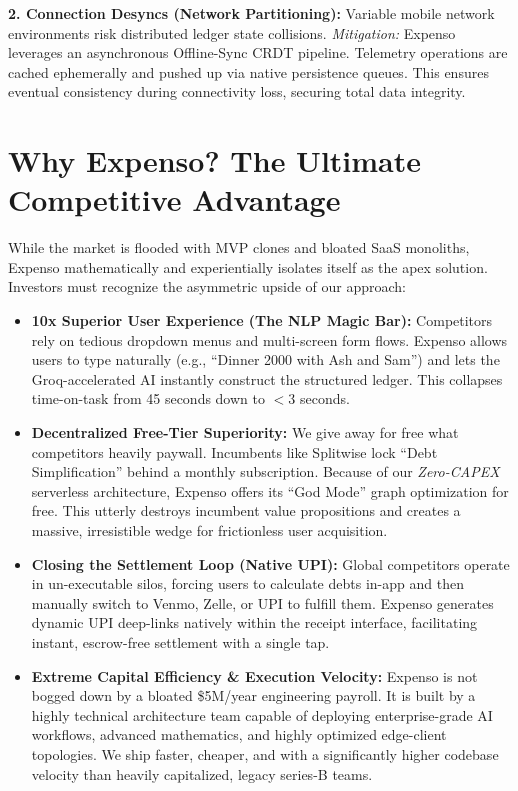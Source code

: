 \documentclass[11pt, letterpaper]{article}
\begin{document}
\textbf{2. Connection Desyncs (Network Partitioning):} Variable mobile network environments risk distributed ledger state collisions.
\textit{Mitigation:} Expenso leverages an asynchronous Offline-Sync CRDT pipeline. Telemetry operations are cached ephemerally and pushed up via native persistence queues. This ensures eventual consistency during connectivity loss, securing total data integrity.

\section{Why Expenso? The Ultimate Competitive Advantage}
While the market is flooded with MVP clones and bloated SaaS monoliths, Expenso mathematically and experientially isolates itself as the apex solution. Investors must recognize the asymmetric upside of our approach:

\begin{itemize}
    \item \textbf{10x Superior User Experience (The NLP Magic Bar):} Competitors rely on tedious dropdown menus and multi-screen form flows. Expenso allows users to type naturally (e.g., ``Dinner 2000 with Ash and Sam'') and lets the Groq-accelerated AI instantly construct the structured ledger. This collapses time-on-task from 45 seconds down to $<3$ seconds.
    \item \textbf{Decentralized Free-Tier Superiority:} We give away for free what competitors heavily paywall. Incumbents like Splitwise lock ``Debt Simplification'' behind a monthly subscription. Because of our \textit{Zero-CAPEX} serverless architecture, Expenso offers its ``God Mode'' graph optimization for free. This utterly destroys incumbent value propositions and creates a massive, irresistible wedge for frictionless user acquisition.
    \item \textbf{Closing the Settlement Loop (Native UPI):} Global competitors operate in un-executable silos, forcing users to calculate debts in-app and then manually switch to Venmo, Zelle, or UPI to fulfill them. Expenso generates dynamic UPI deep-links natively within the receipt interface, facilitating instant, escrow-free settlement with a single tap.
    \item \textbf{Extreme Capital Efficiency \& Execution Velocity:} Expenso is not bogged down by a bloated \$5M/year engineering payroll. It is built by a highly technical architecture team capable of deploying enterprise-grade AI workflows, advanced mathematics, and highly optimized edge-client topologies. We ship faster, cheaper, and with a significantly higher codebase velocity than heavily capitalized, legacy series-B teams.
\end{itemize}
\end{document}

